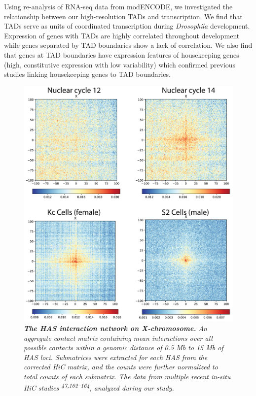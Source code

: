 \documentclass[11pt,twoside]{MPIthesis}
\theoremstyle{definition}
\theoremstyle{definition}
\theoremstyle{definition}
\theoremstyle{remark}
\begin{document}
Using re-analysis of RNA-seq data from modENCODE, we investigated the
relationship between our high-resolution TADs and transcription. We find
that TADs serve as units of coordinated transcription during
\emph{Drosophila} development. Expression of genes with TADs are highly
correlated throughout development while genes separated by TAD
boundaries show a lack of correlation. We also find that genes at TAD
boundaries have expression features of housekeeping genes (high,
constitutive expression with low variability) which confirmed previous
studies linking housekeeping genes to TAD boundaries.
\begin{figure}

{\centering \includegraphics[width=0.7\linewidth]{figures/results_fig2} 

}

\caption[The HAS interaction network on X-chromosome]{\emph{\textbf{The HAS interaction network on X-chromosome.}
An aggregate contact matrix containing mean interactions over all
possible contacts within a genomic distance of 0.5 Mb to 15 Mb of HAS
loci. Submatrices were extracted for each HAS from the corrected HiC
matrix, and the counts were further normalized to total counts of each
submatrix. The data from multiple recent in-situ HiC studies
\textsuperscript{47,162--164}, analyzed during our study.}}\label{fig:unnamed-chunk-7}
\end{figure}
\end{document}
